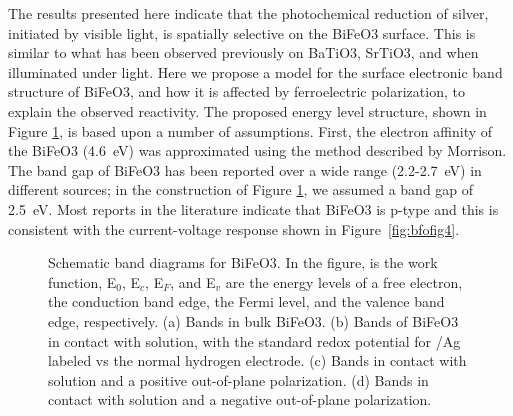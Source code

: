 \documentclass[12pt,%
              twoside,
               letterpaper]{uiothesis}
\begin{document}
The results presented here indicate that the photochemical reduction of silver, initiated
by visible light, is spatially selective on the BiFeO3 surface. This is similar to
what has been observed previously on BaTiO3, SrTiO3, and  when
illuminated under 
light.\cite{Burbure:2010go,Giocondi:2001bi,Giocondi:2003wc,Lowekamp:1998ks,Dunn:2007ja}
Here we propose a model for the surface electronic band structure of BiFeO3, and how
it is affected by ferroelectric polarization, to explain the observed reactivity. The
proposed energy level structure, shown in Figure \ref{fig:bfofig5}, is based upon a number
of assumptions. First, the electron affinity of the BiFeO3 (\SI{4.6}{\electronvolt})
was approximated using the method described by Morrison.\cite{Morrison:1980va} The band
gap of BiFeO3 has been reported over a wide range (2.2-\SI{2.7}{\electronvolt}) in
different sources;\cite{Basu:2008hd,Choi:2009gh,Gao:2006fg} in the construction of Figure
\ref{fig:bfofig5}, we assumed a band gap of \SI{2.5}{\electronvolt}. Most reports in the
literature indicate that BiFeO3 is p-type\cite{Vengalis:2008vi,Yang:2008fo} and this
is consistent with the current-voltage response shown in Figure~\ref{fig:bfofig4}.
\begin{figure}[htbp]
\begin{center}
\caption[Schematic band diagrams for BiFeO3]{Schematic band diagrams for BiFeO3.
In the figure,  is the work function, E$_0$, E$_c$, E$_F$, and E$_v$ are the energy levels
of a free electron, the conduction band edge, the Fermi level, and the valence band edge,
respectively. (a) Bands in bulk BiFeO3. (b) Bands of BiFeO3 in contact with
solution, with the standard redox potential for /Ag labeled vs the normal hydrogen
electrode. (c) Bands in contact with solution and a positive out-of-plane polarization.
(d) Bands in contact with solution and a negative out-of-plane polarization.}
\label{fig:bfofig5}
\end{center}
\end{figure}
\end{document}
